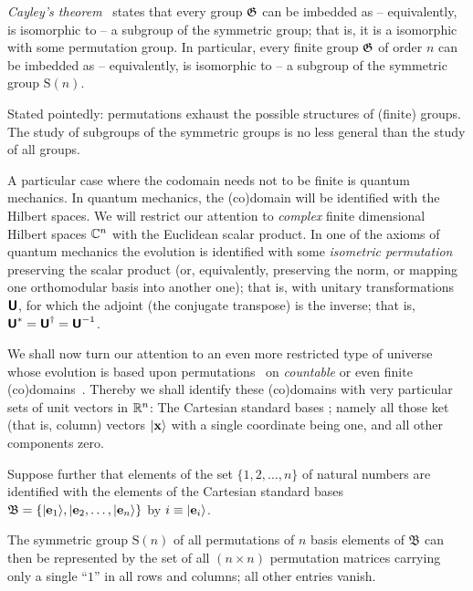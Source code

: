{\em Cayley's theorem}~\cite{Rotman} states that every group ${\frak G}$ can be imbedded as
--
equivalently, is isomorphic to -- a subgroup
of the symmetric group; that is, it is a isomorphic with some permutation group.
In particular, every finite group ${\frak G}$ of order $n$  can be imbedded as
--
equivalently, is isomorphic to -- a subgroup
of the symmetric group $\textrm{S}(n)$.

Stated pointedly: permutations exhaust the possible structures of (finite) groups.
The study of subgroups of the symmetric groups is no less general than the study of all groups.


A particular case where the codomain needs not to be finite is quantum mechanics.
In quantum mechanics, the (co)domain will be identified with the Hilbert spaces.
We will restrict our attention to {\em complex} finite dimensional Hilbert spaces ${\Bbb C}^n$ with the Euclidean scalar product.
In one of the axioms of quantum mechanics the evolution
is identified with some {\em isometric permutation} preserving the scalar product (or, equivalently, preserving the norm,
or mapping one orthomodular basis into another one); that is, with unitary transformations $\textsf{\textbf{U}}$,
for which the adjoint (the conjugate transpose) is the inverse; that is,
$\textsf{\textbf{U}}^\ast=\textsf{\textbf{U}}^\dagger=\textsf{\textbf{U}}^{-1}$.




We shall now turn our attention to an even more restricted type of universe whose evolution is based upon permutations~\cite{permutationcity}
on {\em countable} or even finite (co)domains~\cite{mermin-07}.
Thereby we shall identify these (co)domains with very particular sets of unit vectors in ${\Bbb R}^n$:
The Cartesian standard bases
;
namely all those ket (that is, column) vectors $\vert {\bf x}\rangle$
with a single coordinate being one, and all other components zero.


Suppose further that elements of the set  $\{1,2, \ldots , n\}$ of natural numbers
are identified with the elements of the Cartesian standard bases
$\mathfrak{B}=\left\{ \vert {\bf e}_1 \rangle , \vert {\bf e}_2 , \ldots , \vert {\bf e}_n \rangle \right\}$
by $i \equiv  \vert {\bf e}_i\rangle$.



The symmetric group $\textrm{S}(n)$ of all permutations of $n$ basis elements of $\mathfrak{B}$
can then be represented by the set of all $(n \times n)$ permutation matrices
carrying only a single ``$1$'' in all rows and columns; all other entries vanish.

